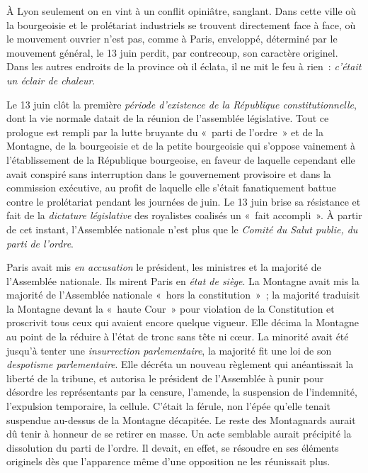 \documentclass[french,twoside]{book} %
\begin{document}
À Lyon seulement on en vint à un conflit opiniâtre, sanglant. Dans cette ville où la bourgeoisie et le prolétariat industriels se trouvent directement face à face, où le mouvement ouvrier n’est pas, comme à Paris, enveloppé, déterminé par le mouvement général, le 13 juin perdit, par contrecoup, son caractère originel. Dans les autres endroits de la province où il éclata, il ne mit le feu à rien : \emph{c’était un éclair de chaleur}.\par
Le 13 juin clôt la première \emph{période d’existence de la République constitutionnelle}, dont la vie normale datait de la réunion de l’assemblée législative. Tout ce prologue est rempli par la lutte bruyante du « parti de l’ordre » et de la Montagne, de la bourgeoisie et de la petite bourgeoisie qui s’oppose vainement à l’établissement de la République bourgeoise, en faveur de laquelle cependant elle avait conspiré sans interruption dans le gouvernement provisoire et dans la commission exécutive, au profit de laquelle elle s’était fanatiquement battue contre le prolétariat pendant les journées de juin. Le 13 juin brise sa résistance et fait de la \emph{dictature législative} des royalistes coalisés un « fait accompli ». À partir de cet instant, l’Assemblée nationale n’est plus que le \emph{Comité du Salut publie, du parti de l’ordre}.\par
Paris avait mis \emph{en accusation} le président, les ministres et la majorité de l’Assemblée nationale. Ils mirent Paris en \emph{état de siège}. La Montagne avait mis la majorité de l’Assemblée nationale « hors la constitution » ; la majorité traduisit la Montagne devant la « haute Cour » pour violation de la Constitution et proscrivit tous ceux qui avaient encore quelque vigueur. Elle décima la Montagne au point de la réduire à l’état de tronc sans tête ni cœur. La minorité avait été jusqu’à tenter une \emph{insurrection parlementaire}, la majorité fit une loi de son \emph{despotisme parlementaire}. Elle décréta un nouveau règlement qui anéantissait la liberté de la tribune, et autorisa le président de l’Assemblée à punir pour désordre les représentants par la censure, l’amende, la suspension de l’indemnité, l’expulsion temporaire, la cellule. C’était la férule, non l’épée qu’elle tenait suspendue au-dessus de la Montagne décapitée. Le reste des Montagnards aurait dû tenir à honneur de se retirer en masse. Un acte semblable aurait précipité la dissolution du parti de l’ordre. Il devait, en effet, se résoudre en ses éléments originels dès que l’apparence même d’une opposition ne les réunissait plus.\par
\end{document}
